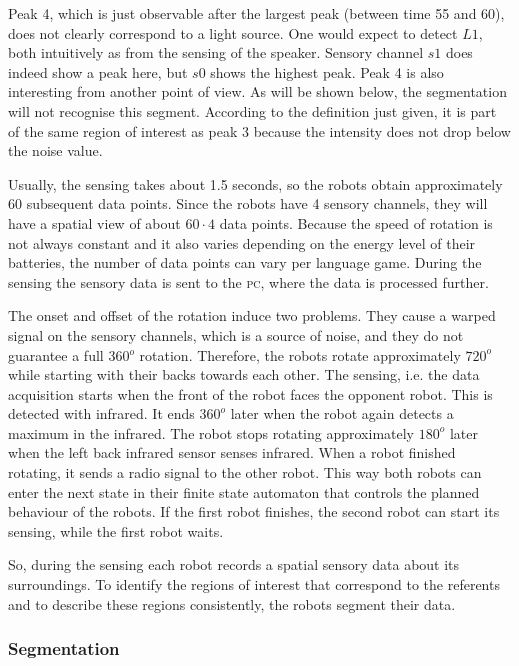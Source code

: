 Peak 4, which is just observable after the largest peak (between time 55 and 60), does not clearly correspond to a light source. One would expect to detect $L1$, both intuitively as from the sensing of the speaker. Sensory channel $s1$ does indeed show a peak here, but $s0$ shows the highest peak. Peak 4 is also interesting from another point of view. As will be shown below, the segmentation will not recognise this segment. According to the definition just given, it is part of the same region of interest as peak 3 because the intensity does not drop below the noise value.


Usually, the sensing takes about 1.5 seconds, so the robots obtain approximately 60 subsequent data points. Since the robots have 4 sensory channels, they will have a spatial view of about $60 \cdot 4$ data points. Because the speed of rotation is not always constant and it also varies depending on the energy level of their batteries, the number of data points can vary per language game. During the sensing the sensory data is sent to the {\scshape pc}, where the data is processed further.

The onset and offset of the rotation induce two problems. They cause a warped signal on the sensory channels, which is a source of noise, and they do not guarantee a full 360$^o$ rotation. Therefore, the robots rotate approximately $720^o$ while starting with their backs towards each other. The sensing, i.e. the data acquisition starts when the front of the robot faces the opponent robot. This is detected with infrared. It ends $360^o$ later when the robot again detects a maximum in the infrared. The robot stops rotating approximately $180^o$ later when the left back infrared sensor senses infrared. When a robot finished rotating, it sends a radio signal to the other robot. This way both robots can enter the next state in their finite state automaton that controls the planned behaviour of the robots. If the first robot finishes, the second robot can start its sensing, while the first robot waits.

So, during the sensing each robot records a spatial sensory data about its surroundings. To identify the regions of interest that correspond to the referents and to describe these regions consistently, the robots segment their data.


\subsubsection{Segmentation}


